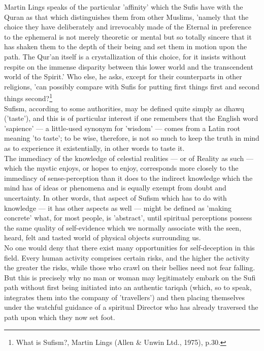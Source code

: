 \documentclass[11pt, b5paper, twoside]{book}
\begin{document}
Martin Lings speaks of the particular 'affinity' which the Sufis have with the Quran as that which 
distinguishes them from other Muslims, 'namely that the choice they have deliberately and irrevocably 
made of the Eternal in preference to the ephemeral is not merely theoretic or mental but so totally 
sincere that it has shaken them to the depth of their being and set them in motion upon the path. The 
Qur'an itself is a crystallization of this choice, for it insists without respite on the immense 
disparity between this lower world and the transcendent world of the Spirit.' Who else, he asks, 
except for their counterparts in other religions, 'can possibly compare with Sufis for putting first 
things first and second things second?\footnote{What is Sufism?, Martin Lings (Allen \& Unwin Ltd., 1975), p.30.} \\

Sufism, according to some authorities, may be defined quite simply as dhawq ('taste'), and this is of 
particular interest if one remembers that the English word 'sapience' --- a little-used synonym for 
'wisdom' --- comes from a Latin root meaning 'to taste'; to be wise, therefore, is not so much to keep 
the truth in mind as to experience it existentially, in other words to taste it. \\

The immediacy of the knowledge of celestial realities --- or of Reality as such --- which the mystic 
enjoys, or hopes to enjoy, corresponds more closely to the immediacy of sense-perception than it does 
to the indirect knowledge which the mind has of ideas or phenomena and is equally exempt from doubt 
and uncertainty. In other words, that aspect of Sufism which has to do with knowledge --- it has other 
aspects as well --- might be defined as 'making concrete' what, for most people, is 'abstract', until 
spiritual perceptions possess the same quality of self-evidence which we normally associate with the 
seen, heard, felt and tasted world of physical objects surrounding us. \\

No one would deny that there exist many opportunities for self-deception in this field. Every human 
activity comprises certain risks, and the higher the activity the greater the risks, while those who 
crawl on their bellies need not fear falling. But this is precisely why no man or woman may 
legitimately embark on the Sufi path without first being initiated into an authentic tariqah (which, 
so to speak, integrates them into the company of 'travellers') and then placing themselves under the 
watchful guidance of a spiritual Director who has already traversed the path upon which they now set 
foot. \\
\end{document}
